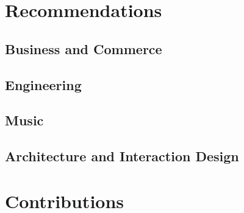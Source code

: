 \documentclass{article}
\begin{document}
\section{Recommendations}
	\subsection{Business and Commerce}
		\pagebreak
	\subsection{Engineering}
		\pagebreak
	\subsection{Music}
		\pagebreak
	\subsection{ Architecture and Interaction Design}
		\pagebreak

\section{Contributions}
	\pagebreak

\section{}
	
	
\end{document}
